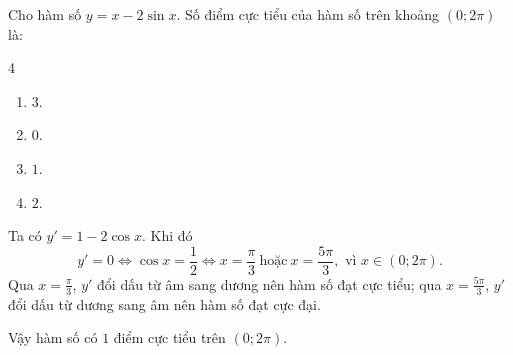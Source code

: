 \begin{baitap}
	Cho hàm số $y = x - 2\sin x$. Số điểm cực tiểu của hàm số trên khoảng $(0; 2\pi)$ là:
	\begin{multicols}{4}
		\begin{enumerate}
			\item $3$.
			\item $0$.
			\item $1$.
			\item $2$.
		\end{enumerate}
	\end{multicols}
	\begin{traloi}
		Ta có $y'=1-2\cos x$. Khi đó
		\[
		y'=0\Leftrightarrow \cos x=\frac{1}{2}
		\Leftrightarrow x=\frac{\pi}{3}\ \text{hoặc}\ x=\frac{5\pi}{3}, \text{ vì } x\in(0;2\pi).
		\]		
		Qua $x=\frac{\pi}{3}$, $y'$ đổi dấu từ âm sang dương nên hàm số đạt cực tiểu; qua $x=\frac{5\pi}{3}$, $y'$ đổi dấu từ dương sang âm nên hàm số đạt cực đại.
		
		Vậy hàm số có $1$ điểm cực tiểu trên $(0;2\pi)$.
	\end{traloi}
\end{baitap}

